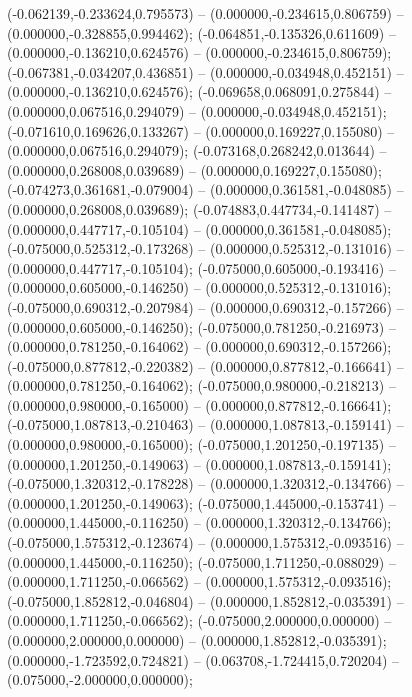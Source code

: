  (-0.062139,-0.233624,0.795573) -- (0.000000,-0.234615,0.806759) -- (0.000000,-0.328855,0.994462);
 (-0.064851,-0.135326,0.611609) -- (0.000000,-0.136210,0.624576) -- (0.000000,-0.234615,0.806759);
 (-0.067381,-0.034207,0.436851) -- (0.000000,-0.034948,0.452151) -- (0.000000,-0.136210,0.624576);
 (-0.069658,0.068091,0.275844) -- (0.000000,0.067516,0.294079) -- (0.000000,-0.034948,0.452151);
 (-0.071610,0.169626,0.133267) -- (0.000000,0.169227,0.155080) -- (0.000000,0.067516,0.294079);
 (-0.073168,0.268242,0.013644) -- (0.000000,0.268008,0.039689) -- (0.000000,0.169227,0.155080);
 (-0.074273,0.361681,-0.079004) -- (0.000000,0.361581,-0.048085) -- (0.000000,0.268008,0.039689);
 (-0.074883,0.447734,-0.141487) -- (0.000000,0.447717,-0.105104) -- (0.000000,0.361581,-0.048085);
 (-0.075000,0.525312,-0.173268) -- (0.000000,0.525312,-0.131016) -- (0.000000,0.447717,-0.105104);
 (-0.075000,0.605000,-0.193416) -- (0.000000,0.605000,-0.146250) -- (0.000000,0.525312,-0.131016);
 (-0.075000,0.690312,-0.207984) -- (0.000000,0.690312,-0.157266) -- (0.000000,0.605000,-0.146250);
 (-0.075000,0.781250,-0.216973) -- (0.000000,0.781250,-0.164062) -- (0.000000,0.690312,-0.157266);
 (-0.075000,0.877812,-0.220382) -- (0.000000,0.877812,-0.166641) -- (0.000000,0.781250,-0.164062);
 (-0.075000,0.980000,-0.218213) -- (0.000000,0.980000,-0.165000) -- (0.000000,0.877812,-0.166641);
 (-0.075000,1.087813,-0.210463) -- (0.000000,1.087813,-0.159141) -- (0.000000,0.980000,-0.165000);
 (-0.075000,1.201250,-0.197135) -- (0.000000,1.201250,-0.149063) -- (0.000000,1.087813,-0.159141);
 (-0.075000,1.320312,-0.178228) -- (0.000000,1.320312,-0.134766) -- (0.000000,1.201250,-0.149063);
 (-0.075000,1.445000,-0.153741) -- (0.000000,1.445000,-0.116250) -- (0.000000,1.320312,-0.134766);
 (-0.075000,1.575312,-0.123674) -- (0.000000,1.575312,-0.093516) -- (0.000000,1.445000,-0.116250);
 (-0.075000,1.711250,-0.088029) -- (0.000000,1.711250,-0.066562) -- (0.000000,1.575312,-0.093516);
 (-0.075000,1.852812,-0.046804) -- (0.000000,1.852812,-0.035391) -- (0.000000,1.711250,-0.066562);
 (-0.075000,2.000000,0.000000) -- (0.000000,2.000000,0.000000) -- (0.000000,1.852812,-0.035391);
 (0.000000,-1.723592,0.724821) -- (0.063708,-1.724415,0.720204) -- (0.075000,-2.000000,0.000000);
